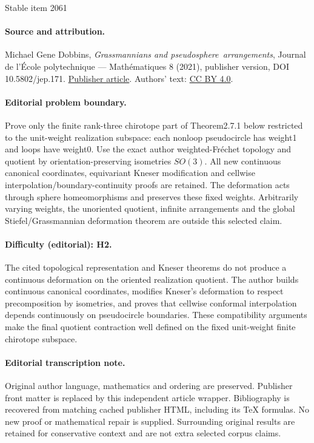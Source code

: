 \documentclass[11pt]{article}
\numberwithin{equation}{section}
\theoremstyle{remark}
\begin{document}
\begin{center}{\Large Stable item 2061}\end{center}
\paragraph{Source and attribution.}
Michael Gene Dobbins, \emph{Grassmannians and pseudosphere arrangements}, Journal de l’École polytechnique — Mathématiques 8 (2021), publisher version, DOI 10.5802/jep.171. \href{https://jep.centre-mersenne.org/articles/10.5802/jep.171/}{Publisher article}. Authors' text: \href{https://creativecommons.org/licenses/by/4.0/}{CC BY 4.0}.
\paragraph{Editorial problem boundary.}
Prove only the finite rank-three chirotope part of Theorem2.7.1 below restricted to the unit-weight realization subspace: each nonloop pseudocircle has weight1 and loops have weight0. Use the exact author weighted-Fréchet topology and quotient by orientation-preserving isometries \(SO(3)\). All new continuous canonical coordinates, equivariant Kneser modification and cellwise interpolation/boundary-continuity proofs are retained. The deformation acts through sphere homeomorphisms and preserves these fixed weights. Arbitrarily varying weights, the unoriented quotient, infinite arrangements and the global Stiefel/Grassmannian deformation theorem are outside this selected claim.
\paragraph{Difficulty (editorial): H2.}
The cited topological representation and Kneser theorems do not produce a continuous deformation on the oriented realization quotient. The author builds continuous canonical coordinates, modifies Kneser's deformation to respect precomposition by isometries, and proves that cellwise conformal interpolation depends continuously on pseudocircle boundaries. These compatibility arguments make the final quotient contraction well defined on the fixed unit-weight finite chirotope subspace.
\paragraph{Editorial transcription note.}
Original author language, mathematics and ordering are preserved. Publisher front matter is replaced by this independent article wrapper. Bibliography is recovered from matching cached publisher HTML, including its TeX formulas. No new proof or mathematical repair is supplied. Surrounding original results are retained for conservative context and are not extra selected corpus claims.
\clearpage
\end{document}
